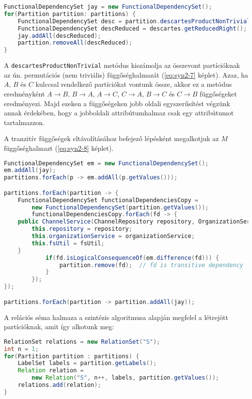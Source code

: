 \linespread{1}
\begin{lstlisting}[language=Java]
FunctionalDependencySet jay = new FunctionalDependencySet();
for(Partition partition: partitions) {
	FunctionalDependencySet desc = partition.descartesProductNonTrivial();
	FunctionalDependencySet descReduced = descartes.getReducedRight();
	jay.addAll(descReduced);
	partition.removeAll(descReduced);
}
\end{lstlisting}

A \lstinline{descartesProductNonTrivial} metódus kiszámolja az összevont partícióknak az ún. permutációs (nem triviális) függőséghalmazát (\ref{eq:syn2-7} képlet). Azaz, ha $A$, $B$ és $C$ kulccsal rendelkező partíciókat vontunk össze, akkor ez a metódus eredményként $A \to B$, $B \to A$, $A \to C$, $C \to A$, $B \to C$ és $C \to B$ függőségeket eredményezi. Majd ezeken a függőségeken jobb oldali egyszerűsítést végzünk annak érdekében, hogy a jobboldali attribútumhalmaz csak egy attribútumot tartalmazzon.

A tranzitív függőségek eltávolításához befejező lépésként megalkotjuk az $M$ függőséghalmazt (\ref{eq:syn2-8} képlet).

\linespread{1}
\begin{lstlisting}[language=Java]
FunctionalDependencySet em = new FunctionalDependencySet();
em.addAll(jay);
partitions.forEach(p -> em.addAll(p.getValues()));

partitions.forEach(partition -> {
	FunctionalDependencySet functionalDependenciesCopy =
		new FunctionalDependencySet(partition.getValues());
		functionalDependenciesCopy.forEach(fd -> {
    public ChannelService(ChannelRepository repository, OrganizationService organizationService, FilesystemUtil fsUtil) {
        this.repository = repository;
        this.organizationService = organizationService;
        this.fsUtil = fsUtil;
    }
			if(fd.isLogicalConsequenceOf(em.difference(fd))) {
				partition.remove(fd);  // fd is transitive dependency
			}
		});
});

partitions.forEach(partition -> partition.addAll(jay));
\end{lstlisting}

A relációs séma halmaza a szintézis algoritmusa alapján megfelel a létrejött partícióknak, amit így alkotunk meg:

\linespread{1}
\begin{lstlisting}[language=Java]
RelationSet relations = new RelationSet("S");
int n = 1;
for(Partition partition : partitions) {
	LabelSet labels = partition.getLabels();
	Relation relation = 
		new Relation("S", n++, labels, partition.getValues());
	relations.add(relation);
}
\end{lstlisting}

